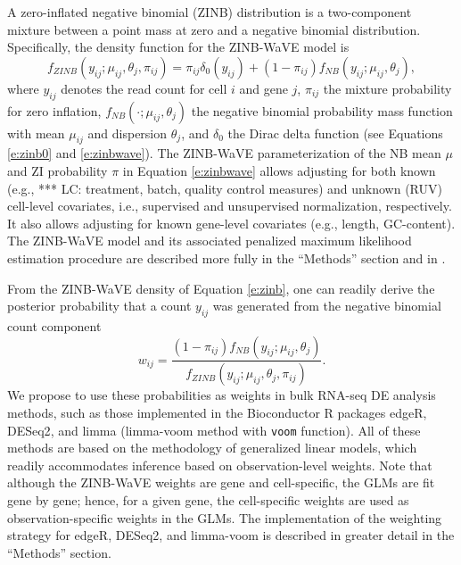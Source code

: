 \documentclass{bmcart}
\newcommand{\RPack}[1]{\textsf{#1}}
\newcommand{\RObj}[1]{\texttt{#1}}
\newcommand{\lc}[1]{\textcolor{ao}{*** LC: #1}}
\begin{document}
A zero-inflated negative binomial (ZINB) distribution is a two-component mixture between a point mass at zero and a negative binomial distribution. Specifically, the density function for the ZINB-WaVE model is
\begin{equation}
\label{e:zinb}
f_{ZINB}(y_{ij};\mu_{ij}, \theta_j, \pi_{ij}) = \pi_{ij}\delta_0(y_{ij}) + (1-\pi_{ij})f_{NB}(y_{ij}; \mu_{ij}, \theta_j ),
\end{equation}
where $y_{ij}$ denotes the read count for cell $i$ and gene $j$, $\pi_{ij}$ the mixture probability for zero inflation, $f_{NB}(\cdot; \mu_{ij}, \theta_{j})$ the negative binomial probability mass function with mean $\mu_{ij}$ and dispersion $\theta_j$, and $\delta_0$ the Dirac delta function (see Equations \eqref{e:zinb0} and \eqref{e:zinbwave}).  
The ZINB-WaVE parameterization of the NB mean $\mu$ and ZI probability $\pi$ in Equation \eqref{e:zinbwave} allows adjusting for both known (e.g., \lc{treatment}, batch, quality control measures) and unknown (RUV) \citep{Gagnon-Bartsch2012, Risso2014NormalizationSamples} cell-level covariates, i.e., supervised and unsupervised normalization, respectively. It also allows adjusting for known gene-level covariates (e.g., length, GC-content). 
The ZINB-WaVE model and its associated penalized maximum likelihood estimation procedure are described more fully in the ``Methods'' section and in \citet{Risso2017}. 

From the ZINB-WaVE density of Equation \eqref{e:zinb}, one can readily derive the posterior probability that a count $y_{ij}$ was generated from the negative binomial count component 
\begin{equation} 
\label{e:weights}
w_{ij} = \frac{ ( 1 - \pi_{ij}) f_{NB}(y_{ij}; \mu_{ij}, \theta_{j} ) }{f_{ZINB}(y_{ij};\mu_{ij}, \theta_{j}, \pi_{ij})}.
\end{equation} 
We propose to use these probabilities as weights in bulk RNA-seq DE analysis methods, such as those implemented in the Bioconductor R packages \RPack{edgeR}, \RPack{DESeq2}, and \RPack{limma} (limma-voom method with \RObj{voom} function). All of these methods are based on the methodology of generalized linear models, which readily accommodates inference based on observation-level weights. Note that although the ZINB-WaVE weights are gene and cell-specific, the GLMs are fit gene by gene; hence, for a given gene, the cell-specific weights are used as observation-specific weights in the GLMs. The implementation of the weighting strategy for \RPack{edgeR}, \RPack{DESeq2}, and limma-voom is described in greater detail in the ``Methods'' section.
\end{document}
